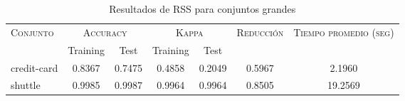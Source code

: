 \begin{table}[]
\centering
\begin{tabular}{l c c c c c c}
\hline
\multirow{2}{*}{\textsc{Conjunto}}
	& \multicolumn{2}{c}{\textsc{Accuracy}}
	& \multicolumn{2}{c}{\textsc{Kappa}}
	& \textsc{Reducción}
	& \textsc{Tiempo promedio (seg)} \\
	& Training & Test
	& Training & Test \\ 
\hline
\hline

credit-card & 0.8367 & 0.7475 & 0.4858 & 0.2049 & 0.5967 & 2.1960 \\
shuttle & 0.9985 & 0.9987 & 0.9964 & 0.9964 & 0.8505 & 19.2569 \\

\hline
\end{tabular}
\caption{Resultados de RSS para conjuntos grandes }
\label{res-large-RSS}
\end{table}

\clearpage


